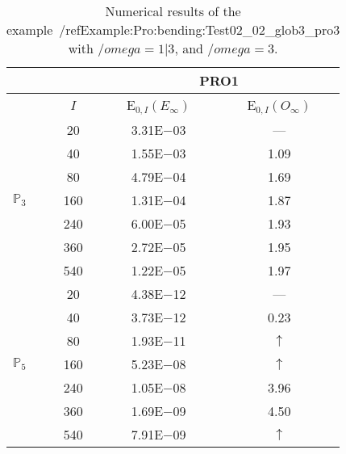 \begin{table}[H]
\caption{Numerical results of the example~/ref{Example:Pro:bending:Test02_02_glob3_pro3} with $/omega=1|3$, and $/omega=3$.}
\setlength{\tabcolsep}{5pt}
\centering
\begin{tabular}{@{}l c c c@{}}
\toprule
 &  & \multicolumn{2}{c}{PRO1}\\
\midrule
 & $I$ & E$_{0,I}(E_{\infty})$ & E$_{0,I}(O_{\infty})$\\
\midrule
\multirow{7}{*}{$\mathbb{P}_{3}$}
 & 20 & 3.31E$-$03 & ---\\
 & 40 & 1.55E$-$03 & 1.09\\
 & 80 & 4.79E$-$04 & 1.69\\
 & 160 & 1.31E$-$04 & 1.87\\
 & 240 & 6.00E$-$05 & 1.93\\
 & 360 & 2.72E$-$05 & 1.95\\
 & 540 & 1.22E$-$05 & 1.97\\
\midrule
\multirow{7}{*}{$\mathbb{P}_{5}$}
 & 20 & 4.38E$-$12 & ---\\
 & 40 & 3.73E$-$12 & 0.23\\
 & 80 & 1.93E$-$11 & $\uparrow$\\
 & 160 & 5.23E$-$08 & $\uparrow$\\
 & 240 & 1.05E$-$08 & 3.96\\
 & 360 & 1.69E$-$09 & 4.50\\
 & 540 & 7.91E$-$09 & $\uparrow$\\
\bottomrule
\end{tabular}
\label{Table:PRO:test_02_02_test11_pro3}
\end{table}
